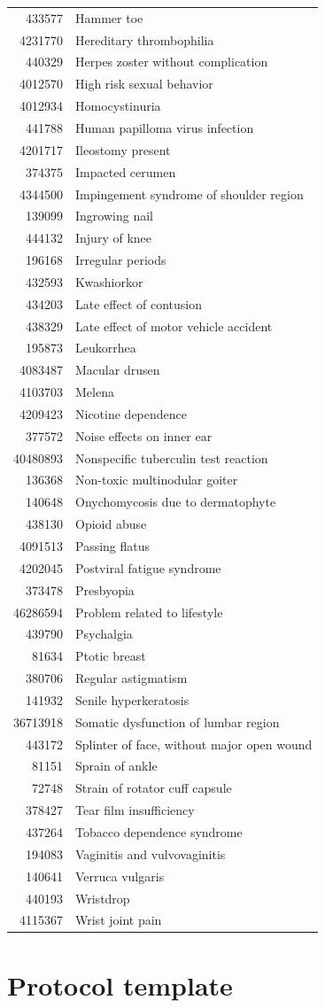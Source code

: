 \documentclass[11pt]{book}
\theoremstyle{definition}
\theoremstyle{definition}
\theoremstyle{definition}
\theoremstyle{remark}
\begin{document}
\begin{longtable}[]{@{}rl@{}}
433577 & Hammer toe\tabularnewline
4231770 & Hereditary thrombophilia\tabularnewline
440329 & Herpes zoster without complication\tabularnewline
4012570 & High risk sexual behavior\tabularnewline
4012934 & Homocystinuria\tabularnewline
441788 & Human papilloma virus infection\tabularnewline
4201717 & Ileostomy present\tabularnewline
374375 & Impacted cerumen\tabularnewline
4344500 & Impingement syndrome of shoulder region\tabularnewline
139099 & Ingrowing nail\tabularnewline
444132 & Injury of knee\tabularnewline
196168 & Irregular periods\tabularnewline
432593 & Kwashiorkor\tabularnewline
434203 & Late effect of contusion\tabularnewline
438329 & Late effect of motor vehicle accident\tabularnewline
195873 & Leukorrhea\tabularnewline
4083487 & Macular drusen\tabularnewline
4103703 & Melena\tabularnewline
4209423 & Nicotine dependence\tabularnewline
377572 & Noise effects on inner ear\tabularnewline
40480893 & Nonspecific tuberculin test reaction\tabularnewline
136368 & Non-toxic multinodular goiter\tabularnewline
140648 & Onychomycosis due to dermatophyte\tabularnewline
438130 & Opioid abuse\tabularnewline
4091513 & Passing flatus\tabularnewline
4202045 & Postviral fatigue syndrome\tabularnewline
373478 & Presbyopia\tabularnewline
46286594 & Problem related to lifestyle\tabularnewline
439790 & Psychalgia\tabularnewline
81634 & Ptotic breast\tabularnewline
380706 & Regular astigmatism\tabularnewline
141932 & Senile hyperkeratosis\tabularnewline
36713918 & Somatic dysfunction of lumbar region\tabularnewline
443172 & Splinter of face, without major open wound\tabularnewline
81151 & Sprain of ankle\tabularnewline
72748 & Strain of rotator cuff capsule\tabularnewline
378427 & Tear film insufficiency\tabularnewline
437264 & Tobacco dependence syndrome\tabularnewline
194083 & Vaginitis and vulvovaginitis\tabularnewline
140641 & Verruca vulgaris\tabularnewline
440193 & Wristdrop\tabularnewline
4115367 & Wrist joint pain\tabularnewline
\bottomrule
\end{longtable}

\hypertarget{ProtocolTemplate}{%
\chapter{Protocol template}\label{ProtocolTemplate}}
\end{document}
